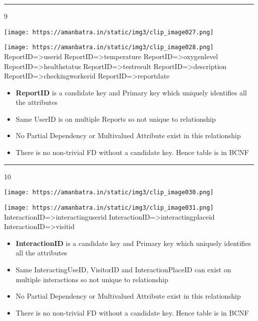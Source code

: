 \documentclass[
]{article}
\providecommand{\tightlist}{%
  \setlength{\itemsep}{0pt}\setlength{\parskip}{0pt}}
\begin{document}
\begin{center}\rule{0.5\linewidth}{0.5pt}\end{center}

9

\texttt{[image: https://amanbatra.in/static/img3/clip\_image027.png]}

\texttt{[image: https://amanbatra.in/static/img3/clip\_image028.png]}
ReportID=\textgreater userid ReportID=\textgreater temperature
ReportID=\textgreater oxygenlevel ReportID=\textgreater healthstatus
ReportID=\textgreater testresult ReportID=\textgreater description
ReportID=\textgreater checkingworkerid ReportID=\textgreater reportdate

\begin{itemize}
\tightlist
\item
  \textbf{ReportID} is a candidate key and Primary key which uniquely
  identifies all the attributes
\item
  Same UserID is on multiple Reports so not unique to relationship
\item
  No Partial Dependency or Multivalued Attribute exist in this
  relationship
\item
  There is no non-trivial FD without a candidate key. Hence table is in
  BCNF
\end{itemize}

\begin{center}\rule{0.5\linewidth}{0.5pt}\end{center}

10

\texttt{[image: https://amanbatra.in/static/img3/clip\_image030.png]}

\texttt{[image: https://amanbatra.in/static/img3/clip\_image031.png]}
InteractionID=\textgreater interactinguserid
InteractionID=\textgreater interactingplaceid
InteractionID=\textgreater visitid

\begin{itemize}
\tightlist
\item
  \textbf{InteractionID} is a candidate key and Primary key which
  uniquely identifies all the attributes
\item
  Same InteractingUseID, VisitorID and InteractionPlaceID can exist on
  multiple interactions so not unique to relationship
\item
  No Partial Dependency or Multivalued Attribute exist in this
  relationship
\item
  There is no non-trivial FD without a candidate key. Hence table is in
  BCNF
\end{itemize}
\end{document}
